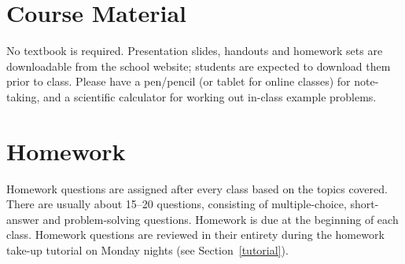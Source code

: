 \documentclass{../oss-handout}
\begin{document}
%
%
%



\section{Course Material}
No textbook is required. Presentation slides, handouts and homework sets are
downloadable from the school website; students are expected to download them
prior to class. Please have a pen/pencil (or tablet for online classes) for
note-taking, and a scientific calculator for working out in-class example
problems.



\section{Homework}
Homework questions are assigned after every class based on the topics covered.
There are usually about 15--20 questions, consisting of multiple-choice,
short-answer and problem-solving questions. Homework is due at the beginning of
each class. Homework questions are reviewed in their entirety during the
homework take-up tutorial on Monday nights (see Section~\ref{tutorial}).
\end{document}
